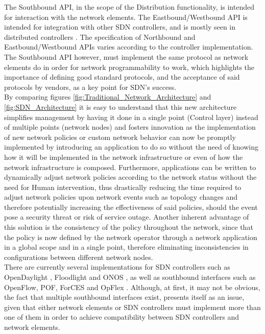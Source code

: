 The Southbound \gls{API}, in the scope of the Distribution functionality, is intended for interaction with the network elements.
The Eastbound/Westbound \gls{API} is intended for integration with other \gls{SDN} controllers, and is mostly seen in distributed controllers \cite{Kreutz2014}.
The specification of Northbound and Eastbound/Westbound \glspl{API} varies according to the controller implementation.
The Southbound \gls{API} however, must implement the same protocol as network elements do in order for network programmability to work, which highlights the importance of defining good standard protocols, and the acceptance of said protocols by vendors, as a key point for \gls{SDN}'s success.\\
%
By comparing figures \ref{fig:Traditional_Network_Architecture} and \ref{fig:SDN_Architecture} it is easy to understand that this new architecture simplifies management by having it done in a single point (Control layer) instead of multiple points (network nodes) and fosters innovation as the implementation of new network policies or custom network behavior can now be promptly implemented by introducing an application to do so without the need of knowing how it will be implemented in the network infrastructure or even of how the network infrastructure is composed.
Furthermore, applications can be written to dynamically adjust network policies according to the network status without the need for Human intervention, thus drastically reducing the time required to adjust network policies upon network events such as topology changes and therefore potentially increasing the effectiveness of said policies, should the event pose a security threat or risk of service outage.
Another inherent advantage of this solution is the consistency of the policy throughout the network, since that the policy is now defined by the network operator through a network application in a global scope and in a single point, therefore eliminating inconsistencies in configurations between different network nodes.\\
%
There are currently several implementations for \gls{SDN} controllers such as OpenDaylight \cite{OpenDaylight}, Floodlight \cite{Floodlight} and ONOS \cite{ControllerComparison} \cite{Kreutz2014}, as well as southbound interfaces such as OpenFlow, POF, ForCES and OpFlex \cite{Kreutz2014}.
Although, at first, it may not be obvious, the fact that multiple southbound interfaces exist, presents itself as an issue, given that either network elements or \gls{SDN} controllers must implement more than one of them in order to achieve compatibility between \gls{SDN} controllers and network elements.
